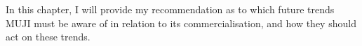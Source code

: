 In this chapter, I will provide my recommendation as to which future trends MUJI must be aware of in relation to its commercialisation, and how they should act on these trends. 